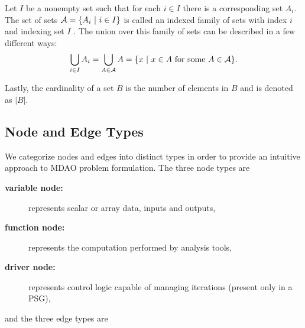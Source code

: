   Let $I$ be a nonempty set such that for each $i \in I$ there is a corresponding set $A_i$. 
  The set of sets $\mathcal A = \{A_i \ | \  i \in I\}$ is called an indexed family of sets with index $i$ and 
  indexing set $I$ \cite{smith2006}. 
  The union over this family of sets can be described in a few different ways:
  \begin{equation}
  \bigcup_{i \in I} A_i = \bigcup_{A \in \mathcal A} A = \{x \ | \  x \in A \textrm{ for some } A \in \mathcal A\}.
  \end{equation}

  Lastly, the cardinality of a set $B$ is the number of elements in $B$ and is denoted as $|B|$.

\subsection{Node and Edge Types}
  \label{ss:types}
We categorize nodes and edges 
  into distinct types in order to provide an intuitive approach to MDAO problem formulation. 
  The three node types are
    \begin{description}
      \item[\bf{variable node:}] represents scalar or array data, inputs and outputs,
      \item[\bf{function node:}] represents the computation performed by analysis tools,
      \item[\bf{driver node:}] represents control logic capable of managing iterations 
      (present only in a PSG),
    \end{description}
  and the three edge types are

